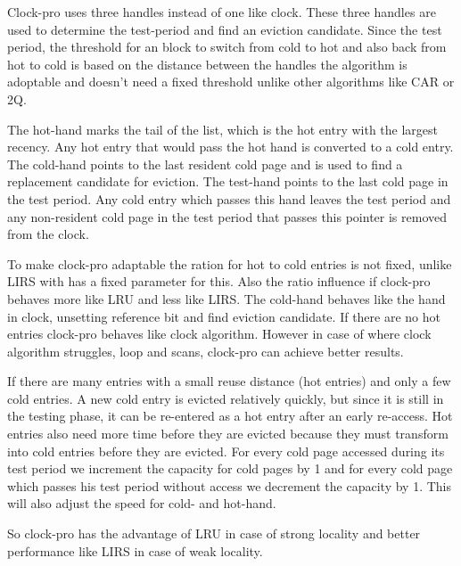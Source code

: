 \documentclass[
	12pt,
	a4paper,
	abstract,
	bibliography=totoc,
	chapterprefix,
	headings=openright,
	numbers=endperiod,
	parskip=half,
	twoside,
]{scrreprt}
\begin{document}
Clock-pro uses three handles instead of one like clock.
These three handles are used to determine the test-period and find an eviction candidate.
Since the test period, the threshold for an block to switch from cold to hot and also back from hot to cold is based on the distance between the handles the algorithm is adoptable and doesn't need a fixed threshold unlike other algorithms like CAR or 2Q.


The hot-hand marks the tail of the list, which is the hot entry with the largest recency.
Any hot entry that would pass the hot hand is converted to a cold entry.
The cold-hand points to the last resident cold page and is used to find a replacement candidate for eviction.
The test-hand points to the last cold page in the test period. Any cold entry which passes this hand leaves the test period and any non-resident cold page in the test period that passes this pointer is removed from the clock.


To make clock-pro adaptable the ration for hot to cold entries is not fixed, unlike LIRS with has a fixed parameter for this.
Also the ratio influence if clock-pro behaves more like LRU and less like LIRS.
The cold-hand behaves like the hand in clock, unsetting reference bit and find eviction candidate.
If there are no hot entries clock-pro behaves like clock algorithm. 
However in case of where clock algorithm struggles, loop and scans, clock-pro can achieve better results.

If there are many entries with a small reuse distance (hot entries) and only a few cold entries. A new cold entry is evicted relatively quickly, but since it is still in the testing phase, it can be re-entered as a hot entry after an early re-access.
Hot entries also need more time before they are evicted because they must transform into cold entries before they are evicted.
For every cold page accessed during its test period we increment the capacity for cold pages by 1 and for every cold page which passes his test period without access we decrement the capacity by 1.
This will also adjust the speed  for cold- and hot-hand.

So clock-pro has the advantage of LRU in case of strong locality and better performance like LIRS in case of weak locality.
\end{document}
